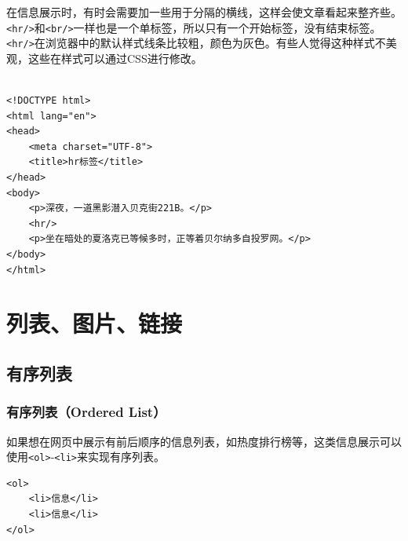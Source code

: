 在信息展示时，有时会需要加一些用于分隔的横线，这样会使文章看起来整齐些。 \\

\lstinline|<hr/>|和\lstinline|<br/>|一样也是一个单标签，所以只有一个开始标签，没有结束标签。 \\

\lstinline|<hr/>|在浏览器中的默认样式线条比较粗，颜色为灰色。有些人觉得这种样式不美观，这些在样式可以通过CSS进行修改。 \\

 \\
\begin{lstlisting}[style=htmlcssjs]
<!DOCTYPE html>
<html lang="en">
<head>
    <meta charset="UTF-8">
    <title>hr标签</title>
</head>
<body>
    <p>深夜，一道黑影潜入贝克街221B。</p>
    <hr/>
    <p>坐在暗处的夏洛克已等候多时，正等着贝尔纳多自投罗网。</p>
</body>
</html>
\end{lstlisting}

\newpage

\chapter{列表、图片、链接}

\section{有序列表}

\subsection{有序列表（Ordered List）}

如果想在网页中展示有前后顺序的信息列表，如热度排行榜等，这类信息展示可以使用\lstinline|<ol>|-\lstinline|<li>|来实现有序列表。 \\

\begin{lstlisting}[style=htmlcssjs]
<ol>
    <li>信息</li>
    <li>信息</li>
</ol>
\end{lstlisting}

